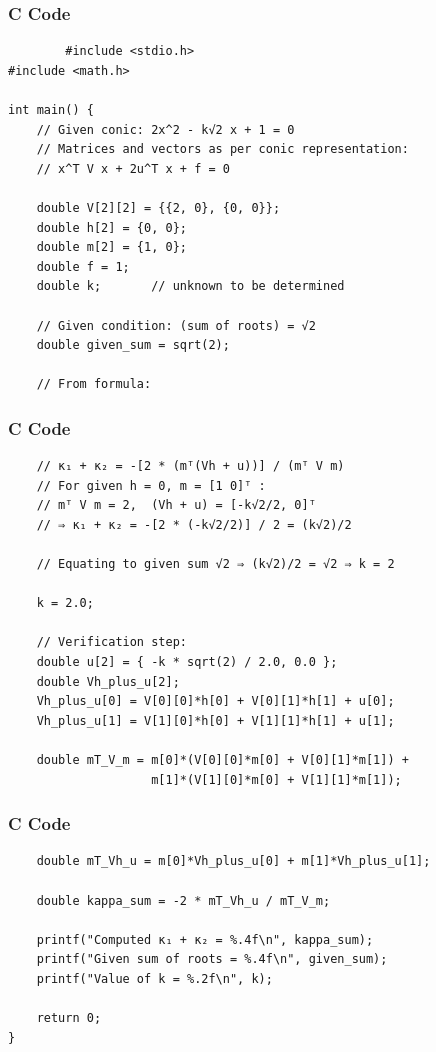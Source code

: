 \documentclass{beamer}
\begin{document}
\begin{frame}[fragile]
    \frametitle{C Code}
    \begin{lstlisting}
        #include <stdio.h>
#include <math.h>

int main() {
    // Given conic: 2x^2 - k√2 x + 1 = 0
    // Matrices and vectors as per conic representation:
    // x^T V x + 2u^T x + f = 0

    double V[2][2] = {{2, 0}, {0, 0}};
    double h[2] = {0, 0};
    double m[2] = {1, 0};
    double f = 1;
    double k;       // unknown to be determined

    // Given condition: (sum of roots) = √2
    double given_sum = sqrt(2);

    // From formula:
    \end{lstlisting}
    \end{frame}
\begin{frame}[fragile]
    \frametitle{C Code}
    \begin{lstlisting}
    // κ₁ + κ₂ = -[2 * (mᵀ(Vh + u))] / (mᵀ V m)
    // For given h = 0, m = [1 0]ᵀ :
    // mᵀ V m = 2,  (Vh + u) = [-k√2/2, 0]ᵀ
    // ⇒ κ₁ + κ₂ = -[2 * (-k√2/2)] / 2 = (k√2)/2

    // Equating to given sum √2 ⇒ (k√2)/2 = √2 ⇒ k = 2

    k = 2.0;

    // Verification step:
    double u[2] = { -k * sqrt(2) / 2.0, 0.0 };
    double Vh_plus_u[2];
    Vh_plus_u[0] = V[0][0]*h[0] + V[0][1]*h[1] + u[0];
    Vh_plus_u[1] = V[1][0]*h[0] + V[1][1]*h[1] + u[1];

    double mT_V_m = m[0]*(V[0][0]*m[0] + V[0][1]*m[1]) +
                    m[1]*(V[1][0]*m[0] + V[1][1]*m[1]);
 \end{lstlisting}
    \end{frame}
\begin{frame}[fragile]
    \frametitle{C Code}
    \begin{lstlisting}
    double mT_Vh_u = m[0]*Vh_plus_u[0] + m[1]*Vh_plus_u[1];

    double kappa_sum = -2 * mT_Vh_u / mT_V_m;

    printf("Computed κ₁ + κ₂ = %.4f\n", kappa_sum);
    printf("Given sum of roots = %.4f\n", given_sum);
    printf("Value of k = %.2f\n", k);

    return 0;
}

    \end{lstlisting}
\end{frame}
\end{document}
